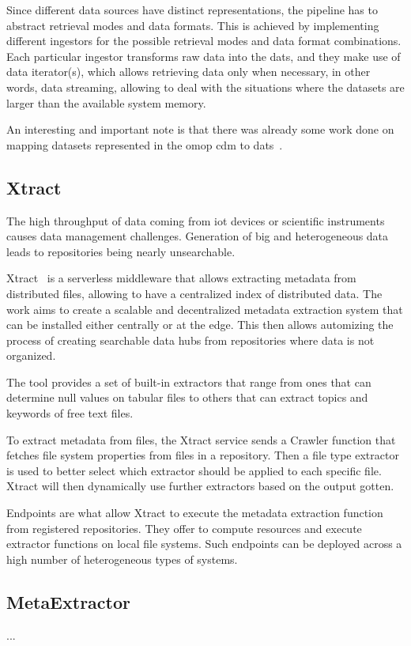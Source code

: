 Since different data sources have distinct representations, the pipeline has to abstract retrieval modes and data formats.
This is achieved by implementing different ingestors for the possible retrieval modes and data format combinations.
Each particular ingestor transforms raw data into the \gls{dats}, and they make use of data iterator(s), which allows retrieving data only when necessary, in other words, data streaming, allowing to deal with the situations where the datasets are larger than the available system memory.

An interesting and important note is that there was already some work done on mapping datasets represented in the \gls{omop} \gls{cdm} to \gls{dats}~\cite{cdm-dats}.

\subsection*{Xtract}
The high throughput of data coming from \gls{iot} devices or scientific instruments causes data management challenges.
Generation of big and heterogeneous data leads to repositories being nearly unsearchable.

Xtract~\cite{xtract} is a serverless middleware that allows extracting metadata from distributed files, allowing to have a centralized index of distributed data.
The work aims to create a scalable and decentralized metadata extraction system that can be installed either centrally or at the edge.
This then allows automizing the process of creating searchable data hubs from repositories where data is not organized.

The tool provides a set of built-in extractors that range from ones that can determine null values on tabular files to others that can extract topics and keywords of free text files.

To extract metadata from files, the Xtract service sends a Crawler function that fetches file system properties from files in a repository.
Then a file type extractor is used to better select which extractor should be applied to each specific file.
Xtract will then dynamically use further extractors based on the output gotten.

Endpoints are what allow Xtract to execute the metadata extraction function from registered repositories.
They offer to compute resources and execute extractor functions on local file systems.
Such endpoints can be deployed across a high number of heterogeneous types of systems.

\subsection*{MetaExtractor}
...

